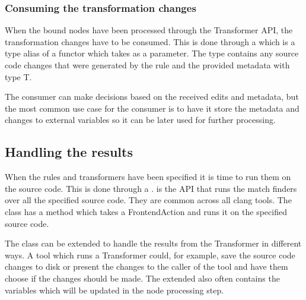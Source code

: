 \subsubsection*{Consuming the transformation changes} \label{subsubsec:080dev:Consumers}

When the bound nodes have been processed through the Transformer API, the transformation changes have to be consumed. This is done through a  which is a type alias of a functor which takes  as a parameter. The  type contains any source code changes that were generated by the rule and the provided metadata with type T.

The consumer can make decisions based on the received edits and metadata, but the most common use case for the consumer is to have it store the metadata and changes to external variables so it can be later used for further processing.

\subsection{Handling the results} \label{subsec:080dev:HandlingToolResults}

When the rules and transformers have been specified it is time to run them on the source code. This is done through a .  is the API that runs the match finders over all the specified source code. They are common across all clang tools. The  class has a  method which takes a FrontendAction and runs it on the specified source code. 

The  class can be extended to handle the results from the Transformer in different ways. A tool which runs a Transformer could, for example, save the source code changes to disk or present the changes to the caller of the tool and have them choose if the changes should be made. The extended  also often contains the variables which will be updated in the node processing step.